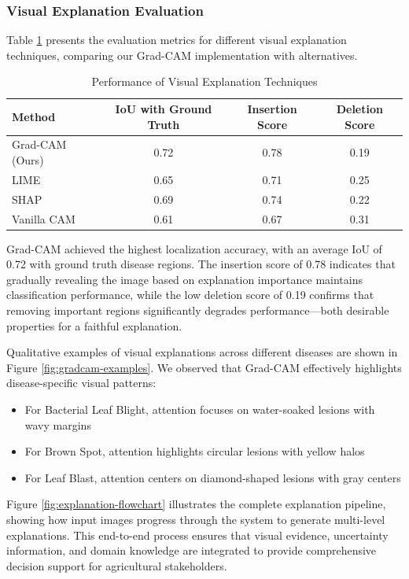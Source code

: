 \subsubsection{Visual Explanation Evaluation}

Table \ref{tab:visual-explanation} presents the evaluation metrics for different visual explanation techniques, comparing our Grad-CAM implementation with alternatives.

\begin{table}[h]
\centering
\caption{Performance of Visual Explanation Techniques}
\label{tab:visual-explanation}
\begin{tabular}{lccc}
\hline
\textbf{Method} & \textbf{IoU with Ground Truth} & \textbf{Insertion Score} & \textbf{Deletion Score} \\
\hline
Grad-CAM (Ours) & 0.72 & 0.78 & 0.19 \\
LIME & 0.65 & 0.71 & 0.25 \\
SHAP & 0.69 & 0.74 & 0.22 \\
Vanilla CAM & 0.61 & 0.67 & 0.31 \\
\hline
\end{tabular}
\end{table}

Grad-CAM achieved the highest localization accuracy, with an average IoU of 0.72 with ground truth disease regions. The insertion score of 0.78 indicates that gradually revealing the image based on explanation importance maintains classification performance, while the low deletion score of 0.19 confirms that removing important regions significantly degrades performance—both desirable properties for a faithful explanation.

Qualitative examples of visual explanations across different diseases are shown in Figure \ref{fig:gradcam-examples}. We observed that Grad-CAM effectively highlights disease-specific visual patterns:

\begin{itemize}
    \item For Bacterial Leaf Blight, attention focuses on water-soaked lesions with wavy margins
    \item For Brown Spot, attention highlights circular lesions with yellow halos
    \item For Leaf Blast, attention centers on diamond-shaped lesions with gray centers
\end{itemize}


Figure \ref{fig:explanation-flowchart} illustrates the complete explanation pipeline, showing how input images progress through the system to generate multi-level explanations. This end-to-end process ensures that visual evidence, uncertainty information, and domain knowledge are integrated to provide comprehensive decision support for agricultural stakeholders.

